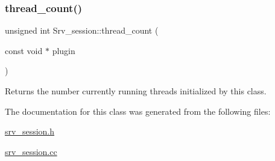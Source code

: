 \subsubsection{\texorpdfstring{thread\+\_\+count()}{thread\_count()}}
{\footnotesize\ttfamily unsigned int Srv\+\_\+session\+::thread\+\_\+count (\begin{DoxyParamCaption}\item[{const void $\ast$}]{plugin }\end{DoxyParamCaption})\hspace{0.3cm}{\ttfamily [static]}}

Returns the number currently running threads initialized by this class. 

The documentation for this class was generated from the following files\+:\begin{DoxyCompactItemize}
\item 
\mbox{\hyperlink{srv__session_8h}{srv\+\_\+session.\+h}}\item 
\mbox{\hyperlink{srv__session_8cc}{srv\+\_\+session.\+cc}}\end{DoxyCompactItemize}
